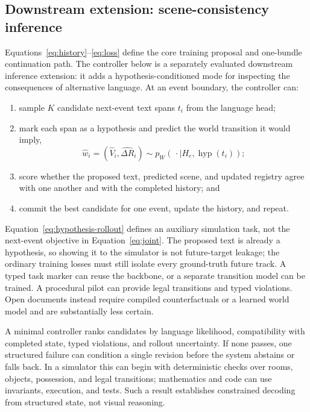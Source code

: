 \documentclass[11pt]{article}
\begin{document}
\subsection{Downstream extension: scene-consistency inference}
\label{sec:sci}

Equations~\ref{eq:history}--\ref{eq:loss} define the core training proposal and one-bundle continuation path. The controller below is a separately evaluated downstream inference extension: it adds a hypothesis-conditioned mode for inspecting the consequences of alternative language. At an event boundary, the controller can:

\begin{enumerate}[leftmargin=1.6em,itemsep=2pt,topsep=3pt]
  \item sample $K$ candidate next-event text spans $t_i$ from the language head;
  \item mark each span as a hypothesis and predict the world transition it would imply,
  \begin{equation}
    \widehat w_i=(\widehat V_i,\widehat{\Delta R}_i)
    \sim p_W(\,\cdot\mid H_e,\operatorname{hyp}(t_i));
    \label{eq:hypothesis-rollout}
  \end{equation}
  \item score whether the proposed text, predicted scene, and updated registry agree with one another and with the completed history; and
  \item commit the best candidate for one event, update the history, and repeat.
\end{enumerate}

Equation~\ref{eq:hypothesis-rollout} defines an auxiliary simulation task, not the next-event objective in Equation~\ref{eq:joint}. The proposed text is already a hypothesis, so showing it to the simulator is not future-target leakage; the ordinary training losses must still isolate every ground-truth future track. A typed task marker can reuse the backbone, or a separate transition model can be trained. A procedural pilot can provide legal transitions and typed violations. Open documents instead require compiled counterfactuals or a learned world model and are substantially less certain.

A minimal controller ranks candidates by language likelihood, compatibility with completed state, typed violations, and rollout uncertainty. If none passes, one structured failure can condition a single revision before the system abstains or falls back. In a simulator this can begin with deterministic checks over rooms, objects, possession, and legal transitions; mathematics and code can use invariants, execution, and tests. Such a result establishes constrained decoding from structured state, not visual reasoning.
\end{document}
